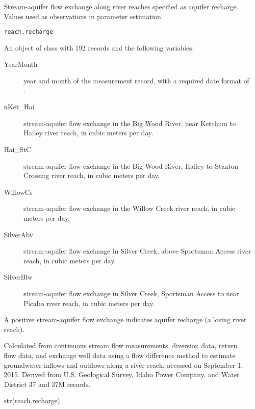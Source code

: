\documentclass[a4paper]{book}
\begin{document}
%
\begin{Description}\relax
Stream-aquifer flow exchange along river reaches specified as aquifer recharge.
Values used as observations in parameter estimation.
\end{Description}
%
\begin{Usage}
\begin{verbatim}
reach.recharge
\end{verbatim}
\end{Usage}
%
\begin{Format}
An object of  class with 192 records and the following variables:
\begin{description}

\item[YearMonth] year and month of the measurement record,
with a required date format of .
\item[nKet\_Hai] stream-aquifer flow exchange in the Big Wood River,
near Ketchum to Hailey river reach, in cubic meters per day.
\item[Hai\_StC] stream-aquifer flow exchange in the Big Wood River,
Hailey to Stanton Crossing river reach, in cubic meters per day.
\item[WillowCr] stream-aquifer flow exchange in the Willow Creek river reach,
in cubic meters per day.
\item[SilverAbv] stream-aquifer flow exchange in Silver Creek,
above Sportsman Access river reach, in cubic meters per day.
\item[SilverBlw] stream-aquifer flow exchange in Silver Creek,
Sportsman Access to near Picabo river reach, in cubic meters per day.

\end{description}
\end{Format}
%
\begin{Details}\relax
A positive stream-aquifer flow exchange indicates aquifer recharge
(a losing river reach).
\end{Details}
%
\begin{Source}\relax
Calculated from continuous stream flow measurements, diversion data,
return flow data, and exchange well data using a flow difference method to
estimate groundwater inflows and outflows along a river reach,
accessed on September 1, 2015.
Derived from U.S. Geological Survey, Idaho Power Company,
and Water District 37 and 37M records.
\end{Source}
%
\begin{Examples}
\begin{ExampleCode}
str(reach.recharge)

\end{ExampleCode}
\end{Examples}
\end{document}
